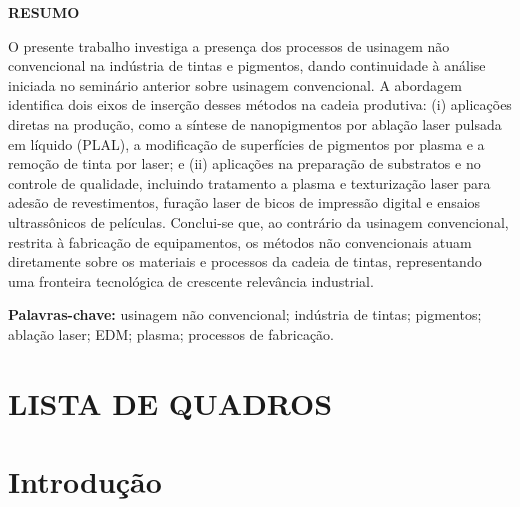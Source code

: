\documentclass[
  12pt,
  a4paper,
  oneside,
  brazil,
  chapter=TITLE
]{article}
\makeatletter
\newcommand{\secbreak}{\clearpage}
\let\oldsection\section
\renewcommand{\section}{\secbreak\oldsection}
\renewcommand{\listofquadros}{%
  \section*{LISTA DE QUADROS}%
  \@starttoc{loq}%
}
\makeatother
\begin{document}
\clearpage
\thispagestyle{empty}
\begin{center}
  {\normalsize\bfseries RESUMO}
\end{center}

\vspace{1em}
\noindent
O presente trabalho investiga a presença dos processos de usinagem não convencional na indústria de tintas e pigmentos, dando continuidade à análise iniciada no seminário anterior sobre usinagem convencional. A abordagem identifica dois eixos de inserção desses métodos na cadeia produtiva: (i) aplicações diretas na produção, como a síntese de nanopigmentos por ablação laser pulsada em líquido (PLAL), a modificação de superfícies de pigmentos por plasma e a remoção de tinta por laser; e (ii) aplicações na preparação de substratos e no controle de qualidade, incluindo tratamento a plasma e texturização laser para adesão de revestimentos, furação laser de bicos de impressão digital e ensaios ultrassônicos de películas. Conclui-se que, ao contrário da usinagem convencional, restrita à fabricação de equipamentos, os métodos não convencionais atuam diretamente sobre os materiais e processos da cadeia de tintas, representando uma fronteira tecnológica de crescente relevância industrial.

\vspace{1em}
\noindent\textbf{Palavras-chave:} usinagem não convencional; indústria de tintas; pigmentos; ablação laser; EDM; plasma; processos de fabricação.

\clearpage
\thispagestyle{empty}
\listofquadros

\clearpage
\thispagestyle{empty}
\tableofcontents

\section{Introdução}\label{introducao}
\end{document}
